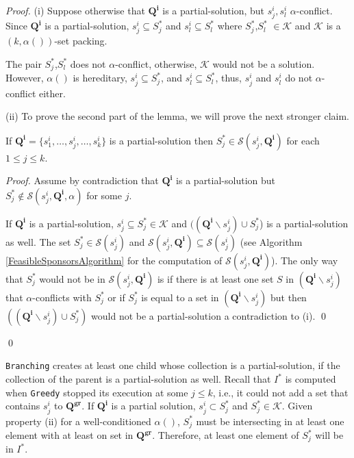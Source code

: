 \begin{proof}
(i) Suppose otherwise that $\mathbf{Q^i}$ is a partial-solution, but $s^i_j,s^i_l$ $\alpha$-conflict. 
Since $\mathbf{Q^i}$ is a partial-solution, $s^i_j \subseteq S^*_j$ and $s^i_l \subseteq S^*_l$ where  $S^*_j$,$S^*_l$ $\in \mathcal{K}$ and $\mathcal{K}$ is a $(k,\alpha())$-set packing. 

The pair $S^*_j$,$S^*_l$ does not $\alpha$-conflict, otherwise, $\mathcal{K}$ would not be a solution.
However, $\alpha()$ is hereditary, $s^i_j \subseteq S^*_j$, and $s^i_l \subseteq S^*_l$, thus, $s^i_j$ and $s^i_l$ do not $\alpha$-conflict either.

(ii) To prove the second part of the lemma, we will prove the next stronger claim. 

\indent \begin{cl}\label{FeasibleSponsorsLemma}
If $\mathbf{Q^i}=\{s^i_1,\dots, s^i_j, \dots, s^i_k\}$ is a partial-solution then $S^*_j \in \mathcal{S}(s^i_j,\mathbf{Q^i})$ for each $1 \leq j \leq k$.
\end{cl}

\begin{proof}
Assume by contradiction that $\mathbf{Q^i}$ is a partial-solution but $S^*_j \notin \mathcal{S}(s^i_j,\mathbf{Q^i},\alpha)$ for some $j$.

If $\mathbf{Q^i}$ is a partial-solution, $s^i_j \subseteq S^*_j \in \mathcal{K}$ and $((\mathbf{Q^i} \backslash s^i_j) \cup S^*_j$) is a partial-solution as well. 
The set $S^*_j \in \mathcal{S}(s^i_j)$ and $\mathcal{S}(s^i_j,\mathbf{Q^i}) \subseteq \mathcal{S}(s^i_j)$ (see Algorithm \ref{FeasibleSponsorsAlgorithm} for the computation of $\mathcal{S}(s^i_j,\mathbf{Q^i})$). 
The only way that $S^*_j$ would not be in $\mathcal{S}(s^i_j,\mathbf{Q^i})$ is if there is at least one set $S$ in $(\mathbf{Q^i} \backslash s^i_j)$ that $\alpha$-conflicts with $S^*_j$ or if $S^*_j$ is equal to a set in $(\mathbf{Q^i} \backslash s^i_j)$ but then $((\mathbf{Q^i} \backslash s^i_j) \cup S^*_j)$ would not be a partial-solution a contradiction to (i). \qed
\end{proof} 
\qed
\end{proof}


\texttt{Branching} creates at least one child whose collection is a partial-solution, if the collection of the parent is a partial-solution as well. Recall that $I^*$ is computed when \texttt{Greedy} stopped its execution at some $j \leq k$, i.e., it could not add a set that contains $s^i_j$ to $\mathbf{Q^{gr}}$. If $\mathbf{Q^i}$ is a partial solution, $s^i_j \subset S^*_j$ and $S^*_j \in \mathcal{K}$. Given property (ii) for a well-conditioned $\alpha()$, $S^*_j$ must be intersecting in at least one element with at least on set in $\mathbf{Q^{gr}}$. Therefore, at least one element of $S^*_j$ will be in $I^*$.

